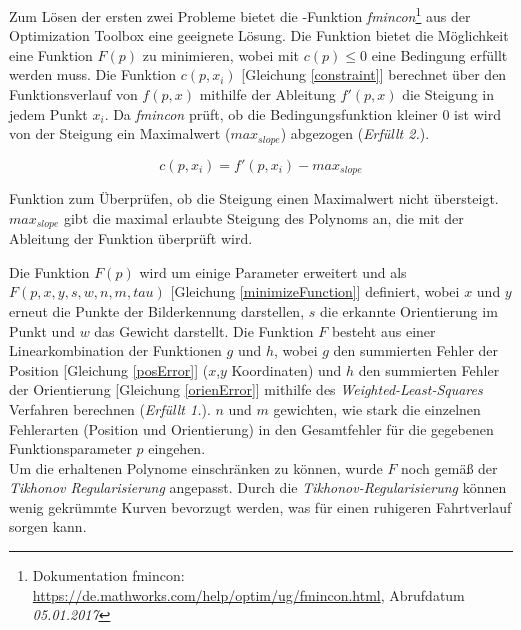 Zum Lösen der ersten zwei Probleme bietet die \matlab -Funktion \textit{fmincon}\footnote{Dokumentation fmincon: \url{https://de.mathworks.com/help/optim/ug/fmincon.html}, Abrufdatum \textit{05.01.2017}} aus der Optimization Toolbox eine geeignete Lösung. Die Funktion bietet die Möglichkeit eine Funktion $F(p)$ zu minimieren, wobei mit $c(p) \leq 0$ eine Bedingung erfüllt werden muss. Die Funktion $c(p,x_i)$ [Gleichung \ref{constraint}] berechnet über den Funktionsverlauf von $f(p,x)$ mithilfe der Ableitung $f'(p,x)$ die Steigung in jedem Punkt $x_i$. Da \textit{fmincon} prüft, ob die Bedingungsfunktion kleiner 0 ist wird von der Steigung ein Maximalwert ($max_{slope}$) abgezogen (\textit{Erfüllt 2.}).\\
\begin{ownequation}[H]
\begin{equation}
c(p,x_i) = f'(p,x_i)-max_{slope}
\end{equation}
\caption[Funktion zum Überprüfen ob die Steigung einen Maximalwert nicht übersteigt.]{Funktion zum Überprüfen, ob die Steigung einen Maximalwert nicht übersteigt. $max_{slope}$ gibt die maximal erlaubte Steigung des Polynoms an, die mit der Ableitung der Funktion überprüft wird.}
\label{constraint}
\end{ownequation}
Die Funktion $F(p)$ wird um einige Parameter erweitert und als $F(p,x,y,s,w,n,m,tau)$ [Gleichung \ref{minimizeFunction}] definiert, wobei $x$ und $y$ erneut die Punkte der Bilderkennung darstellen, $s$ die erkannte Orientierung im Punkt und $w$ das Gewicht darstellt. Die Funktion $F$ besteht aus einer Linearkombination der Funktionen $g$ und $h$, wobei $g$ den summierten Fehler der Position [Gleichung \ref{posError}] ($x$,$y$ Koordinaten) und $h$ den summierten Fehler der Orientierung [Gleichung \ref{orienError}] mithilfe des \textit{Weighted-Least-Squares} Verfahren berechnen (\textit{Erfüllt 1.}). $n$ und $m$ gewichten, wie stark die einzelnen Fehlerarten (Position und Orientierung) in den Gesamtfehler für die gegebenen Funktionsparameter $p$ eingehen.\\
Um die erhaltenen Polynome einschränken zu können, wurde $F$ noch gemäß der \textit{Tikhonov Regularisierung} \cite{kaipio2006statistical} angepasst. Durch die \textit{Tikhonov-Regularisierung} können wenig gekrümmte Kurven bevorzugt werden, was für einen ruhigeren Fahrtverlauf sorgen kann.
